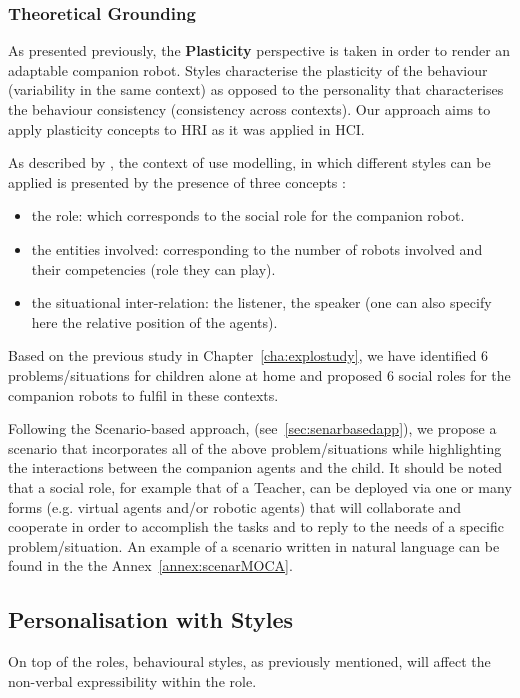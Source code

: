 \documentclass[smallextended]{svjour3}
\begin{document}
\subsubsection{Theoretical Grounding}
As presented previously, the \textbf{Plasticity} perspective is taken in order to render an adaptable companion robot.
Styles characterise the plasticity of the behaviour (variability in the same context) as opposed to the personality that characterises the behaviour consistency (consistency across contexts).
Our approach aims to apply plasticity concepts to HRI as it was applied in HCI. 

As described by \cite{Coutaz2012}, the context of use modelling, in which different styles can be applied is presented by the presence of three concepts :
\begin{itemize}[noitemsep,nolistsep]
\item the role: which corresponds to the social role for the companion robot.
\item the entities involved: corresponding to the number of robots involved and their competencies (role they can play).
\item the situational inter-relation: the listener, the speaker (one can also specify here the relative position of the agents).
\end{itemize}
Based on the previous study in Chapter~\ref{cha:explostudy}, we have identified 6 problems/situations for children alone at home and proposed 6 social roles for the companion robots to fulfil in these contexts.

Following the Scenario-based approach, (see~\ref{sec:senarbasedapp}), we propose a scenario that incorporates all of the above problem/situations while highlighting the interactions between the companion agents and the child. 
It should be noted that a social role, for example that of a Teacher, can be deployed via one or many forms (e.g. virtual agents and/or robotic agents) that will collaborate and cooperate in order to accomplish the tasks and to reply to the needs of a specific problem/situation.
An example of a scenario written in natural language can be found in the the Annex~\ref{annex:scenarMOCA}.




\subsection{Personalisation with Styles}
On top of the roles, behavioural styles, as previously mentioned, will affect the non-verbal expressibility within the role.
\end{document}
